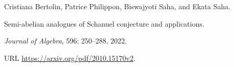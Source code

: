 Cristiana Bertolin, Patrice Philippon, Biswajyoti Saha, and Ekata Saha.

\newblock Semi-abelian analogues of {Schanuel} conjecture and applications.

\newblock \emph{Journal of Algebra}, 596: 250--288, 2022.

\newblock URL \url{https://arxiv.org/pdf/2010.15170v2}.

